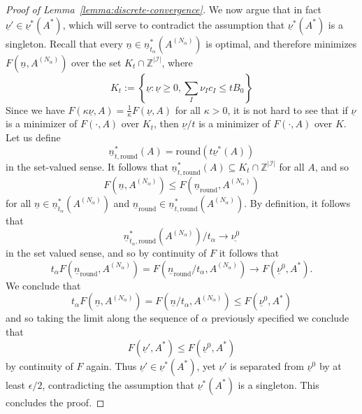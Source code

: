 \documentclass{article} %
\newcommand{\ul}[1]{\underline{#1}}
\begin{document}
\begin{proof}[Proof of Lemma~\ref{lemma:discrete-convergence}]
    We now argue that in fact $\ul{\nu}'\in \ul{\nu}^*(A^*)$, which will serve to contradict the assumption that $\ul{\nu}^*(A^*)$ is a singleton. Recall that every $\ul{n} \in \ul{n}^*_{t_\alpha}(A^{(N_\alpha)})$ is optimal, and therefore minimizes $F(\ul{n},A^{(N_\alpha)})$ over the set $K_t\cap \mathbb{Z}^{|\mathcal{I}|}$, where
    \[
    K_t:=\left\{\ul{\nu}:\ul{\nu}\geq0,\sum_I\nu_Ic_I\leq tB_0\right\}
    \]
    Since we have $F(\kappa \ul{\nu},A)=\frac{1}{\kappa}F(\ul{\nu},A)$ for all $\kappa>0$, it is not hard to see that if $\ul{\nu}$ is a minimizer of $F(\cdot,A)$ over $K_t$, then $\ul{\nu}/t$ is a minimizer of $F(\cdot,A)$ over $K$. Let us define
    \[
    \ul{n}^*_{t,\text{round}}(A)=\text{round}(t\ul{\nu}^*(A))
    \]
    in the set-valued sense. It follows that $\ul{n}^*_{t,\text{round}}(A)\subseteq  K_t\cap \mathbb{Z}^{|\mathcal{I}|}$ for all $A$, and so
    \[
    F(\ul{n},A^{(N_\alpha)})\leq F(\ul{n}_{\text{round}},A^{(N_\alpha)})
    \]
    for all $\ul{n}\in\ul{n}^*_{t_\alpha}(A^{(N_\alpha)})$ and $\ul{n}_{\text{round}}\in \ul{n}^*_{t,\text{round}}(A^{(N_\alpha)})$. By definition, it follows that
    \[
    \ul{n}^*_{t_\alpha,\text{round}}(A^{(N_\alpha)})/t_\alpha\to \ul{\nu^0}
    \]
    in the set valued sense, and so by continuity of $F$ it follows that
    \[
    t_\alpha F(\ul{n}_{\text{round}},A^{(N_\alpha)}) = F(\ul{n}_{\text{round}}/t_\alpha,A^{(N_\alpha)}) \to F(\ul{\nu}^0,A^*).
    \]
    We conclude that
    \[
    t_\alpha F(\ul{n},A^{(N_\alpha)}) = F(\ul{n}/t_\alpha ,A^{(N_\alpha)}) \leq F(\ul{\nu}^0,A^*)
    \]
    and so taking the limit along the sequence of $\alpha$ previously specified we conclude that
    \[
    F(\ul{\nu}',A^*)\leq F(\ul{\nu}^0,A^*)
    \]
    by continuity of $F$ again. Thus $\ul{\nu}'\in \ul{\nu}^*(A^*)$, yet $\ul{\nu}'$ is separated from $\ul{\nu}^0$ by at least $\epsilon/2$, contradicting the assumption that $\ul{\nu}^*(A^*)$ is a singleton. This concludes the proof.
    
    


    

    
    
\end{proof}
\end{document}

